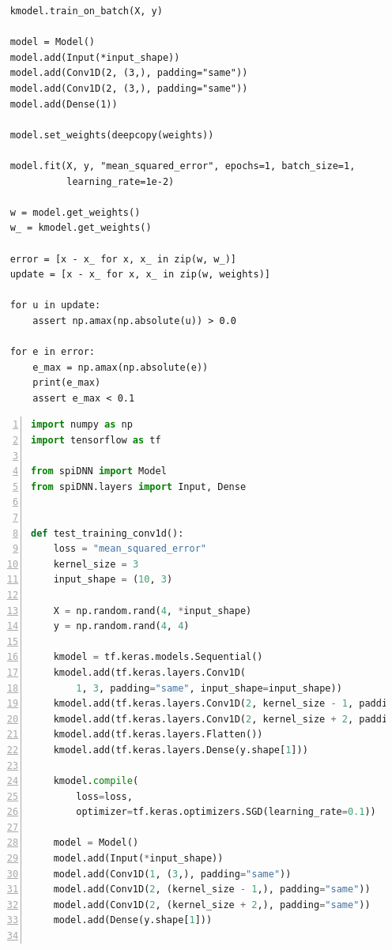 \documentclass[]{article}
\begin{document}
\begin{appendices}
\begin{lstlisting}
    kmodel.train_on_batch(X, y)

    model = Model()
    model.add(Input(*input_shape))
    model.add(Conv1D(2, (3,), padding="same"))
    model.add(Conv1D(2, (3,), padding="same"))
    model.add(Dense(1))

    model.set_weights(deepcopy(weights))

    model.fit(X, y, "mean_squared_error", epochs=1, batch_size=1,
              learning_rate=1e-2)

    w = model.get_weights()
    w_ = kmodel.get_weights()

    error = [x - x_ for x, x_ in zip(w, w_)]
    update = [x - x_ for x, x_ in zip(w, weights)]

    for u in update:
        assert np.amax(np.absolute(u)) > 0.0

    for e in error:
        e_max = np.amax(np.absolute(e))
        print(e_max)
        assert e_max < 0.1
\end{lstlisting}

\newpage

\begin{lstlisting}[language=Python, caption={Excerpt from the test
  suite showing the biggest CNN trained with the prototye, without
  dropped packets.}, captionpos=b, numbers=left,
  label={lst:training_cnn}]
import numpy as np
import tensorflow as tf

from spiDNN import Model
from spiDNN.layers import Input, Dense


def test_training_conv1d():
    loss = "mean_squared_error"
    kernel_size = 3
    input_shape = (10, 3)

    X = np.random.rand(4, *input_shape)
    y = np.random.rand(4, 4)

    kmodel = tf.keras.models.Sequential()
    kmodel.add(tf.keras.layers.Conv1D(
        1, 3, padding="same", input_shape=input_shape))
    kmodel.add(tf.keras.layers.Conv1D(2, kernel_size - 1, padding="same"))
    kmodel.add(tf.keras.layers.Conv1D(2, kernel_size + 2, padding="same"))
    kmodel.add(tf.keras.layers.Flatten())
    kmodel.add(tf.keras.layers.Dense(y.shape[1]))

    kmodel.compile(
        loss=loss,
        optimizer=tf.keras.optimizers.SGD(learning_rate=0.1))

    model = Model()
    model.add(Input(*input_shape))
    model.add(Conv1D(1, (3,), padding="same"))
    model.add(Conv1D(2, (kernel_size - 1,), padding="same"))
    model.add(Conv1D(2, (kernel_size + 2,), padding="same"))
    model.add(Dense(y.shape[1]))


\end{lstlisting}
\end{appendices}
\end{document}
